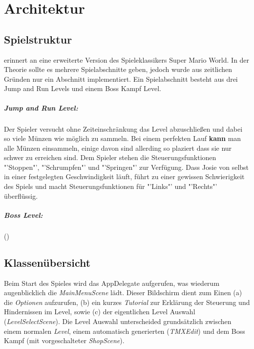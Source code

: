 \chapter{Architektur}\label{ch:arch}

\section{Spielstruktur}\label{sec:Spielstruktur}
\gamename  erinnert an eine erweiterte Version des Spieleklassikers Super Mario World.
In der Theorie sollte es mehrere Spielabschnitte geben, jedoch wurde aus zeitlichen Gründen nur ein Abschnitt implementiert. Ein Spielabschnitt besteht aus drei Jump and Run Levels und einem Boss Kampf Level. 

\paragraph{Jump and Run Level:}
Der Spieler versucht ohne Zeiteinschränkung das Level abzuschließen und dabei so viele Münzen wie möglich zu sammeln. Bei einem perfekten Lauf \textbf{kann} man alle Münzen einsammeln, einige davon sind allerding so plaziert dass sie nur schwer zu erreichen sind.
Dem Spieler stehen die Steuerungsfunktionen "'Stoppen"', "'Schrumpfen"' und "'Springen"' zur Verfügung. 
Dass Josie von selbst in einer festgelegten Geschwindigkeit läuft, führt zu einer gewissen Schwierigkeit des Spiels und macht Steuerungsfunktionen für "'Links"' und "'Rechts"' überflüssig.

\paragraph{Boss Level:}

()

\section{Klassenübersicht}\label{sec:Klassenuebersicht}

Beim Start des Spieles wird das AppDelegate aufgerufen, was wiederum augenblicklich die \textit{MainMenuScene} lädt. Dieser Bildschirm dient zum Einen (a) die \textit{Optionen} aufzurufen, (b) ein kurzes \textit{Tutorial} zur Erklärung der Steuerung und Hindernissen im Level, sowie (c) der eigentlichen Level Auswahl (\textit{LevelSelectScene}).
Die Level Auswahl unterscheided grundsätzlich zwischen einem normalen \textit{Level}, einem automatisch generierten (\textit{TMXEdit}) und dem Boss Kampf (mit vorgeschalteter \textit{ShopScene}).

